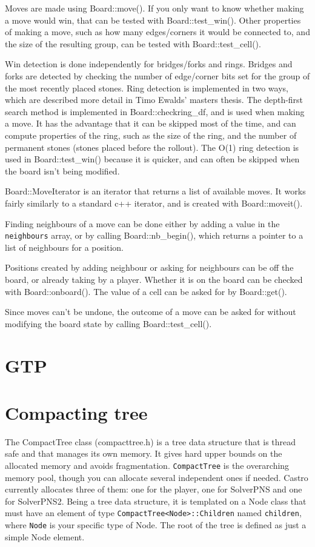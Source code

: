 \documentclass[12pt]{article}          %
\begin{document}
Moves are made using Board::move(). If you only want to know whether making a move would win, that can be tested with Board::test\_win(). Other properties of making a move, such as how many edges/corners it would be connected to, and the size of the resulting group, can be tested with Board::test\_cell().

Win detection is done independently for bridges/forks and rings. Bridges and forks are detected by checking the number of edge/corner bits set for the group of the most recently placed stones. Ring detection is implemented in two ways, which are described more detail in Timo Ewalds' masters thesis. The depth-first search method is implemented in Board::checkring\_df, and is used when making a move. It has the advantage that it can be skipped most of the time, and can compute properties of the ring, such as the size of the ring, and the number of permanent stones (stones placed before the rollout). The O(1) ring detection is used in Board::test\_win() because it is quicker, and can often be skipped when the board isn't being modified.

Board::MoveIterator is an iterator that returns a list of available moves. It works fairly similarly to a standard c++ iterator, and is created with Board::moveit().

Finding neighbours of a move can be done either by adding a value in the \texttt{neighbours} array, or by calling Board::nb\_begin(), which returns a pointer to a list of neighbours for a position.

Positions created by adding neighbour or asking for neighbours can be off the board, or already taking by a player. Whether it is on the board can be checked with Board::onboard(). The value of a cell can be asked for by Board::get().

Since moves can't be undone, the outcome of a move can be asked for without modifying the board state by calling Board::test\_cell().

\section{GTP}

\section{Compacting tree}

The CompactTree class (compacttree.h) is a tree data structure that is thread safe and that manages its own memory. It gives hard upper bounds on the allocated memory and avoids fragmentation. \texttt{CompactTree} is the overarching memory pool, though you can allocate several independent ones if needed. Castro currently allocates three of them: one for the player, one for SolverPNS and one for SolverPNS2. Being a tree data structure, it is templated on a Node class that must have an element of type \texttt{CompactTree<Node>::Children} named \texttt{children}, where \texttt{Node} is your specific type of Node. The root of the tree is defined as just a simple Node element.
\end{document}
